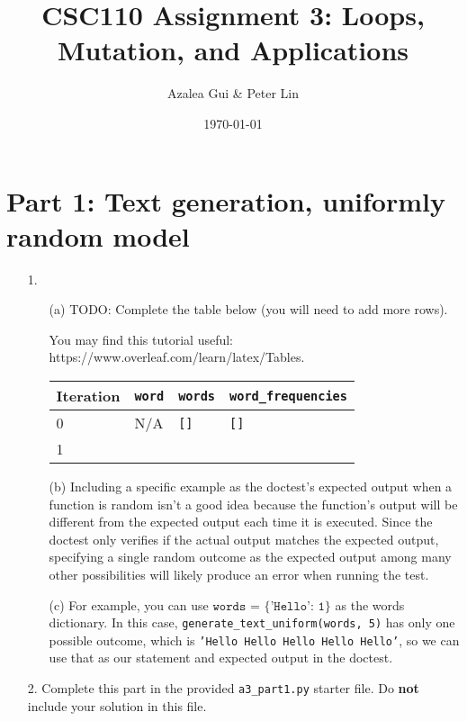 \documentclass[fontsize=11pt]{article}
\title{CSC110 Assignment 3: Loops, Mutation, and Applications}
\author{Azalea Gui \& Peter Lin}
\date{\today}
\begin{document}
\maketitle

\section*{Part 1: Text generation, uniformly random model}

\begin{enumerate}

\item[1.]
\begin{enumerate}
    \item[(a)]
    TODO: Complete the table below (you will need to add more rows).

    You may find this tutorial useful: https://www.overleaf.com/learn/latex/Tables.

    \begin{tabular}{|l|l|l|l|}
    \hline
    Iteration & \verb|word| & \verb|words| & \verb|word_frequencies|\\
    \hline
    0 & N/A & \texttt{[]} & \texttt{[]} \\
    1 & & & \\
    \hline
    \end{tabular}

    \item[(b)]
    Including a specific example as the doctest's expected output when a function is random isn't a good idea because the function's output will be different from the expected output each time it is executed. Since the doctest only verifies if the actual output matches the expected output, specifying a single random outcome as the expected output among many other possibilities will likely produce an error when running the test.

    \item[(c)]
    For example, you can use $\texttt{words = \{'Hello': 1\}}$ as the words dictionary. In this case, \texttt{generate\_text\_uniform(words, 5)} has only one possible outcome, which is \texttt{'Hello Hello Hello Hello Hello'}, so we can use that as our statement and expected output in the doctest.
\end{enumerate}

\item[2.]
Complete this part in the provided \texttt{a3\_part1.py} starter file.
Do \textbf{not} include your solution in this file.

\end{enumerate}
\end{document}
